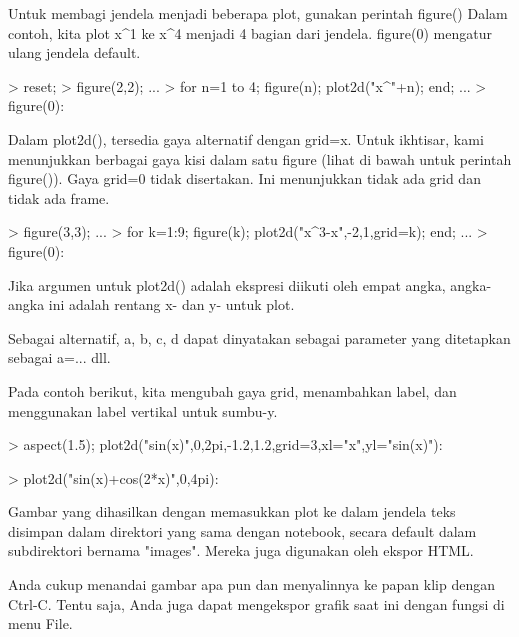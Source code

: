 \documentclass{report}
\begin{document}
\begin{eulernotebook}
\begin{eulercomment}
\begin{eulercomment}
\begin{eulercomment}
\begin{eulercomment}
\begin{eulercomment}
Untuk membagi jendela menjadi beberapa plot, gunakan perintah figure()
Dalam contoh, kita plot x\textasciicircum{}1 ke x\textasciicircum{}4 menjadi 4 bagian dari jendela.
figure(0) mengatur ulang jendela default.
\end{eulercomment}
\begin{eulerprompt}
> reset;
> figure(2,2); ...
> for n=1 to 4; figure(n); plot2d("x^"+n); end; ...
> figure(0):
\end{eulerprompt}
\begin{eulercomment}
Dalam plot2d(), tersedia gaya alternatif dengan grid=x. Untuk
ikhtisar, kami menunjukkan berbagai gaya kisi dalam satu figure (lihat
di bawah untuk perintah figure()). Gaya grid=0 tidak disertakan. Ini
menunjukkan tidak ada grid dan tidak ada frame.
\end{eulercomment}
\begin{eulerprompt}
> figure(3,3); ...
> for k=1:9; figure(k); plot2d("x^3-x",-2,1,grid=k); end; ...
> figure(0):
\end{eulerprompt}
\begin{eulercomment}
Jika argumen untuk plot2d() adalah ekspresi diikuti oleh empat angka,
angka-angka ini adalah rentang x- dan y- untuk plot.

Sebagai alternatif, a, b, c, d dapat dinyatakan sebagai parameter yang
ditetapkan sebagai a=... dll.

Pada contoh berikut, kita mengubah gaya grid, menambahkan label, dan
menggunakan label vertikal untuk sumbu-y.
\end{eulercomment}
\begin{eulerprompt}
> aspect(1.5); plot2d("sin(x)",0,2pi,-1.2,1.2,grid=3,xl="x",yl="sin(x)"):
\end{eulerprompt}
\begin{eulerprompt}
> plot2d("sin(x)+cos(2*x)",0,4pi):
\end{eulerprompt}
\begin{eulercomment}
Gambar yang dihasilkan dengan memasukkan plot ke dalam jendela teks
disimpan dalam direktori yang sama dengan notebook, secara default
dalam subdirektori bernama "images". Mereka juga digunakan oleh ekspor
HTML.

Anda cukup menandai gambar apa pun dan menyalinnya ke papan klip
dengan Ctrl-C. Tentu saja, Anda juga dapat mengekspor grafik saat ini
dengan fungsi di menu File.


\end{eulercomment}
\end{eulercomment}
\end{eulercomment}
\end{eulercomment}
\end{eulercomment}
\end{eulernotebook}
\end{document}
